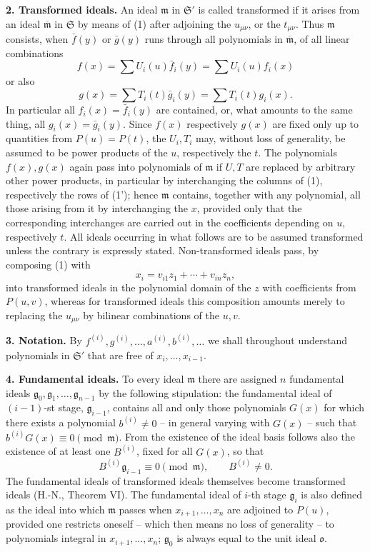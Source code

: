 \documentclass[11pt]{article}
\providecommand{\frakS}{\mathfrak S}
\providecommand{\frakm}{\mathfrak m}
\providecommand{\frakg}{\mathfrak g}
\providecommand{\frako}{\mathfrak o}
\providecommand{\barfrakm}{\overline{\mathfrak m}}
\begin{document}
\textbf{2. Transformed ideals.} An ideal $\frakm$ in $\frakS'$ is called transformed if it arises from an ideal $\barfrakm$ in $\frakS$ by means of (1) after adjoining the $u_{\mu\nu}$, or the $t_{\mu\nu}$. Thus $\frakm$ consists, when $\bar f(y)$ or $\bar g(y)$ runs through all polynomials in $\barfrakm$, of all linear combinations
\[
 f(x)=\sum U_i(u)\bar f_i(y)=\sum U_i(u)f_i(x)
\]
or also
\[
 g(x)=\sum T_i(t)\bar g_i(y)=\sum T_i(t)g_i(x).
\]
In particular all $f_i(x)=\bar f_i(y)$ are contained, or, what amounts to the same thing, all $g_i(x)=\bar g_i(y)$. Since $f(x)$ respectively $g(x)$ are fixed only up to quantities from $P(u)=P(t)$, the $U_i,T_i$ may, without loss of generality, be assumed to be power products of the $u$, respectively the $t$. The polynomials $f(x),g(x)$ again pass into polynomials of $\frakm$ if $U,T$ are replaced by arbitrary other power products, in particular by interchanging the columns of (1), respectively the rows of (1'); hence $\frakm$ contains, together with any polynomial, all those arising from it by interchanging the $x$, provided only that the corresponding interchanges are carried out in the coefficients depending on $u$, respectively $t$. All ideals occurring in what follows are to be assumed transformed unless the contrary is expressly stated. Non-transformed ideals pass, by composing (1) with
\[
 x_i=v_{i1}z_1+\cdots+v_{in}z_n,
\]
into transformed ideals in the polynomial domain of the $z$ with coefficients from $P(u,v)$, whereas for transformed ideals this composition amounts merely to replacing the $u_{\mu\nu}$ by bilinear combinations of the $u,v$.

\textbf{3. Notation.} By $f^{(i)},g^{(i)},\ldots,a^{(i)},b^{(i)},\ldots$ we shall throughout understand polynomials in $\frakS'$ that are free of $x_i,\ldots,x_{i-1}$.

\textbf{4. Fundamental ideals.} To every ideal $\frakm$ there are assigned $n$ fundamental ideals $\frakg_0,\frakg_1,\ldots,\frakg_{n-1}$ by the following stipulation: the fundamental ideal of $(i-1)$-st stage, $\frakg_{i-1}$, contains all and only those polynomials $G(x)$ for which there exists a polynomial $b^{(i)}\ne0$ -- in general varying with $G(x)$ -- such that $b^{(i)}G(x)\equiv0\pmod{\frakm}$. From the existence of the ideal basis follows also the existence of at least one $B^{(i)}$, fixed for all $G(x)$, so that
\begin{equation}
 B^{(i)}\frakg_{i-1}\equiv0\pmod{\frakm},\qquad B^{(i)}\ne0 . \tag{2}
\end{equation}
The fundamental ideals of transformed ideals themselves become transformed ideals (H.-N., Theorem VI). The fundamental ideal of $i$-th stage $\frakg_i$ is also defined as the ideal into which $\frakm$ passes when $x_{i+1},\ldots,x_n$ are adjoined to $P(u)$, provided one restricts oneself -- which then means no loss of generality -- to polynomials integral in $x_{i+1},\ldots,x_n$; $\frakg_0$ is always equal to the unit ideal $\frako$.
\end{document}

